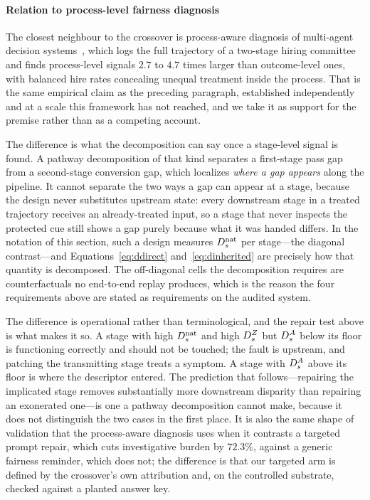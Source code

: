 \paragraph{Relation to process-level fairness diagnosis}
The closest neighbour to the crossover is process-aware diagnosis of multi-agent decision
systems~\cite{scopedhiring}, which logs the full trajectory of a two-stage hiring committee and
finds process-level signals $2.7$ to $4.7$ times larger than outcome-level ones, with balanced
hire rates concealing unequal treatment inside the process. That is the same empirical claim as
the preceding paragraph, established independently and at a scale this framework has not reached,
and we take it as support for the premise rather than as a competing account.

The difference is what the decomposition can say once a stage-level signal is found. A pathway
decomposition of that kind separates a first-stage pass gap from a second-stage conversion gap,
which localizes \emph{where a gap appears} along the pipeline. It cannot separate the two ways a
gap can appear at a stage, because the design never substitutes upstream state: every downstream
stage in a treated trajectory receives an already-treated input, so a stage that never inspects
the protected cue still shows a gap purely because what it was handed differs. In the notation of
this section, such a design measures $D^{\mathrm{nat}}_s$ per stage---the diagonal contrast---and
Equations~\eqref{eq:ddirect} and~\eqref{eq:dinherited} are precisely how that quantity is
decomposed. The off-diagonal cells the decomposition requires are counterfactuals no end-to-end
replay produces, which is the reason the four requirements above are stated as requirements on
the audited system.

The difference is operational rather than terminological, and the repair test above is what makes
it so. A stage with high $D^{\mathrm{nat}}_s$ and high $D^{Z}_s$ but $D^{A}_s$ below its floor is functioning
correctly and should not be touched; the fault is upstream, and patching the transmitting stage
treats a symptom. A stage with $D^{A}_s$ above its floor is where the descriptor entered. The
prediction that follows---repairing the implicated stage removes substantially more downstream
disparity than repairing an exonerated one---is one a pathway decomposition cannot make, because
it does not distinguish the two cases in the first place. It is also the same shape of validation
that the process-aware diagnosis uses when it contrasts a targeted prompt repair, which cuts
investigative burden by $72.3\%$, against a generic fairness reminder, which does not; the
difference is that our targeted arm is defined by the crossover's own attribution and, on the
controlled substrate, checked against a planted answer key.
